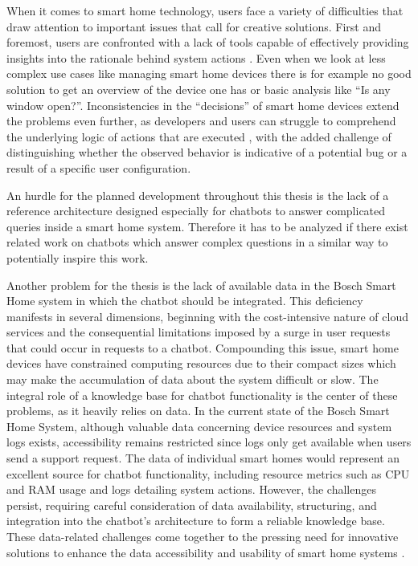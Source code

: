 When it comes to smart home technology, users face a variety of difficulties that draw attention to important issues that call for creative solutions. First and foremost, users are confronted with a lack of tools capable of effectively providing insights into the rationale behind system actions \cite{kok2022explainableartificialintelligencexai}.
Even when we look at less complex use cases like managing smart home devices there is for example no good solution to get an overview of the device one has or basic analysis like ``Is any window open?''.
Inconsistencies in the ``decisions'' of smart home devices extend the problems even further, as developers and users can struggle to comprehend the underlying logic of actions that are executed \cite{kok2022explainableartificialintelligencexai}, with the added challenge of distinguishing whether the observed behavior is indicative of a potential bug or a result of a specific user configuration.

An hurdle for the planned development throughout this thesis is the lack of a reference architecture designed especially for chatbots to answer complicated queries inside a smart home system.
Therefore it has to be analyzed if there exist related work on chatbots which answer complex questions in a similar way to potentially inspire this work.

Another problem for the thesis is the lack of available data in the Bosch Smart Home system in which the chatbot should be integrated.
This deficiency manifests in several dimensions, beginning with the cost-intensive nature of cloud services and the consequential limitations imposed by a surge in user requests that could occur in requests to a chatbot. 
Compounding this issue, smart home devices have constrained computing resources due to their compact sizes which may make the accumulation of data about the system difficult or slow. 
The integral role of a knowledge base for chatbot functionality is the center of these problems, as it heavily relies on data. 
In the current state of the Bosch Smart Home System, although valuable data concerning device resources and system logs exists, accessibility remains restricted since logs only get available when users send a support request.
The data of individual smart homes would represent an excellent source for chatbot functionality, including resource metrics such as CPU and RAM usage and logs detailing system actions.
However, the challenges persist, requiring careful consideration of data availability, structuring, and integration into the chatbot's architecture to form a reliable knowledge base. 
These data-related challenges come together to the pressing need for innovative solutions to enhance the data accessibility and usability of smart home systems \cite{7753232}.

